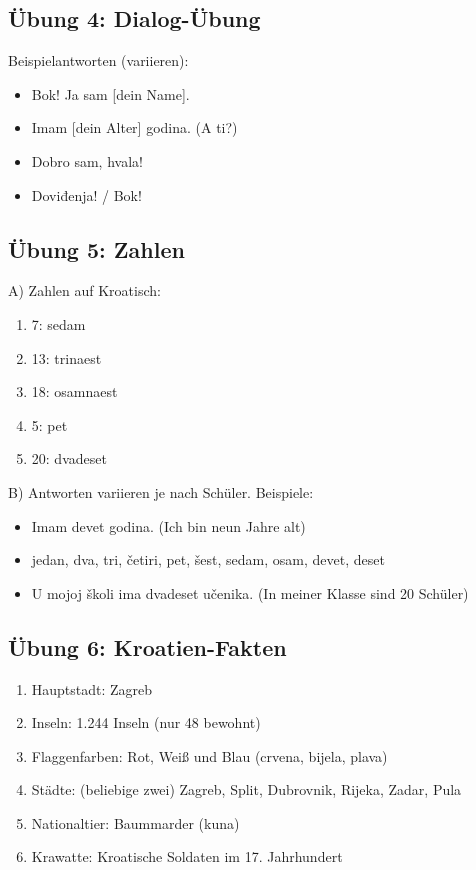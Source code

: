 \subsection*{Übung 4: Dialog-Übung}

Beispielantworten (variieren):
\begin{itemize}
    \item Bok! Ja sam [dein Name].
    \item Imam [dein Alter] godina. (A ti?)
    \item Dobro sam, hvala!
    \item Doviđenja! / Bok!
\end{itemize}

\subsection*{Übung 5: Zahlen}

A) Zahlen auf Kroatisch:
\begin{enumerate}
    \item 7: sedam
    \item 13: trinaest
    \item 18: osamnaest
    \item 5: pet
    \item 20: dvadeset
\end{enumerate}

B) Antworten variieren je nach Schüler. Beispiele:
\begin{itemize}
    \item Imam devet godina. (Ich bin neun Jahre alt)
    \item jedan, dva, tri, četiri, pet, šest, sedam, osam, devet, deset
    \item U mojoj školi ima dvadeset učenika. (In meiner Klasse sind 20 Schüler)
\end{itemize}

\subsection*{Übung 6: Kroatien-Fakten}

\begin{enumerate}
    \item Hauptstadt: Zagreb
    \item Inseln: 1.244 Inseln (nur 48 bewohnt)
    \item Flaggenfarben: Rot, Weiß und Blau (crvena, bijela, plava)
    \item Städte: (beliebige zwei) Zagreb, Split, Dubrovnik, Rijeka, Zadar, Pula
    \item Nationaltier: Baummarder (kuna)
    \item Krawatte: Kroatische Soldaten im 17. Jahrhundert
\end{enumerate}

